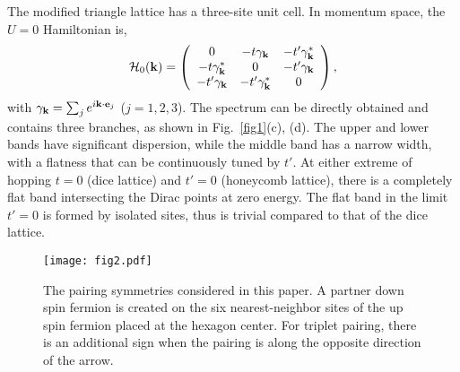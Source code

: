 \documentclass[%
 reprint,
 amsmath,amssymb,
 aps,
]{revtex4-1}
\begin{document}
The modified triangle lattice has a three-site unit cell.
In momentum space, the $U=0$ Hamiltonian is,
\begin{equation}\label{eq1K}
{\cal H}_{0}({\bf k})=\left(
                    \begin{array}{ccc}
                      0 & -t\gamma_{\bf k} & -t'\gamma^*_{\bf k} \\
                      -t\gamma^*_{\bf k} & 0 & -t'\gamma_{\bf k} \\
                      -t'\gamma_{\bf k} & -t'\gamma^*_{\bf k} & 0 \\
                    \end{array}
                  \right),
\end{equation}
with $\gamma_{\bf k}=\sum_{j}e^{i{\bf k}\cdot {\bf e}_{j}}$ ($j=1,2,3$).
The spectrum can be directly obtained and contains three branches, as shown
in Fig.~\ref{fig1}(c), (d).  The upper and lower bands have significant
dispersion, while the middle band has a
narrow width,  with a flatness that can be continuously tuned by $t'$.
At either extreme of hopping $t=0$ (dice lattice) and $t'=0$ (honeycomb
lattice), there is a completely flat band intersecting the Dirac points
at zero energy. The flat band in the limit $t'=0$ is formed by isolated
sites, thus is trivial compared to that of the dice lattice.

\begin{figure}[htbp]
\centering \texttt{[image: fig2.pdf]} \caption{The pairing
symmetries considered in this paper.  A partner
down spin fermion is created on the
six nearest-neighbor sites of the up spin fermion placed at the hexagon
center. For triplet
pairing, there is an additional sign when the pairing is along the
opposite direction of the arrow.}
\label{fig2}
\end{figure}
\end{document}
